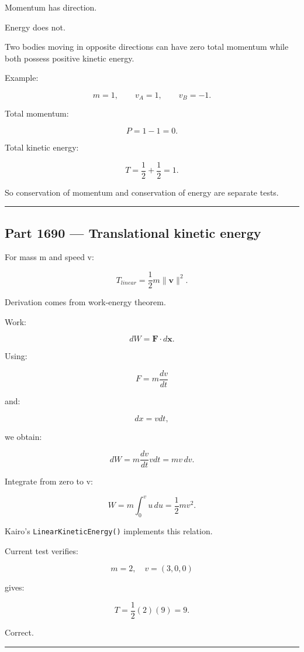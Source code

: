 Momentum has direction.

Energy does not.

Two bodies moving in opposite directions can have zero total momentum while both possess positive kinetic energy.

Example:

\[
m=1,
\qquad
v_A=1,
\qquad
v_B=-1.
\]

Total momentum:

\[
P=1-1=0.
\]

Total kinetic energy:

\[
T=
\frac12+
\frac12
=
1.
\]

So conservation of momentum and conservation of energy are separate tests.

\begin{center}\rule{0.5\linewidth}{0.5pt}\end{center}

\subsection{Part 1690 --- Translational kinetic energy}\label{06-engine-ii-ch039-part-1690-translational-kinetic-energy}

For mass m and speed v:

\[
\boxed{
T_{linear}
=
\frac12m\|\mathbf v\|^2.
}
\]

Derivation comes from work-energy theorem.

Work:

\[
dW
=
\mathbf F\cdot d\mathbf x.
\]

Using:

\[
F=m\frac{dv}{dt}
\]

and:

\[
dx=vdt,
\]

we obtain:

\[
dW
=
m\frac{dv}{dt}vdt
=
mv\,dv.
\]

Integrate from zero to v:

\[
W
=
m\int_0^v u\,du
=
\frac12mv^2.
\]

Kairo's \texttt{LinearKineticEnergy()} implements this relation.

Current test verifies:

\[
m=2,
\quad
v=(3,0,0)
\]

gives:

\[
T=
\frac12(2)(9)=9.
\]

Correct.

\begin{center}\rule{0.5\linewidth}{0.5pt}\end{center}

